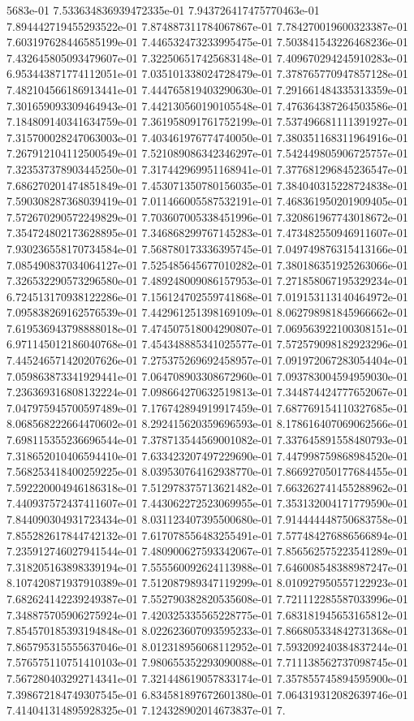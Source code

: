5683e-01	7.533634836939472335e-01	7.943726417475770463e-01	7.894442719455293522e-01	7.874887311784067867e-01	7.784270019600323387e-01	7.603197628446585199e-01	7.446532473233995475e-01	7.503841543226468236e-01	7.432645805093479607e-01	7.322506517425683148e-01	7.409670294245910283e-01	6.953443871774112051e-01	7.035101338024728479e-01	7.378765770947857128e-01	7.482104566186913441e-01	7.444765819403290630e-01	7.291661484335313359e-01	7.301659093309464943e-01	7.442130560190105548e-01	7.476364387264503586e-01	7.184809140341634759e-01	7.361958091761752199e-01	7.537496681111391927e-01	7.315700028247063003e-01	7.403461976774740050e-01	7.380351168311964916e-01	7.267912104112500549e-01	7.521089086342346297e-01	7.542449805906725757e-01	7.323537378903445250e-01	7.317442969951168941e-01	7.377681296845236547e-01	7.686270201474851849e-01	7.453071350780156035e-01	7.384040315228724838e-01	7.590308287368039419e-01	7.011466005587532191e-01	7.468361950201909405e-01	7.572670290572249829e-01	7.703607005338451996e-01	7.320861967743018672e-01	7.354724802173628895e-01	7.346868299767145283e-01	7.473482550946911607e-01	7.930236558170734584e-01	7.568780173336395745e-01	7.049749876315413166e-01	7.085490837034064127e-01	7.525485645677010282e-01	7.380186351925263066e-01	7.326532290573296580e-01	7.489248009086157953e-01	7.271858067195329234e-01	6.724513170938122286e-01	7.156124702559741868e-01	7.019153113140464972e-01	7.095838269162576539e-01	7.442961251398169109e-01	8.062798981845966662e-01	7.619536943798888018e-01	7.474507518004290807e-01	7.069563922100308151e-01	6.971145012186040768e-01	7.454348885341025577e-01	7.572579098182923296e-01	7.445246571420207626e-01	7.275375269692458957e-01	7.091972067283054404e-01	7.059863873341929441e-01	7.064708903308672960e-01	7.093783004594959030e-01	7.236369316808132224e-01	7.098664270632519813e-01	7.344874424777652067e-01	7.047975945700597489e-01	7.176742894919917459e-01	7.687769154110327685e-01	8.068568222664470602e-01	8.292415620359696593e-01	8.178616407069062566e-01	7.698115355236696544e-01	7.378713544569001082e-01	7.337645891558480793e-01	7.318652010406594410e-01	7.633423207497229690e-01	7.447998759868984520e-01	7.568253418400259225e-01	8.039530764162938770e-01	7.866927050177684455e-01	7.592220004946186318e-01	7.512978375713621482e-01	7.663262741455288962e-01	7.440937572437411607e-01	7.443062272523069955e-01	7.353132004171779590e-01	7.844090304931723434e-01	8.031123407395500680e-01	7.914444448750683758e-01	7.855282617844742132e-01	7.617078556483255491e-01	7.577484276886566894e-01	7.235912746027941544e-01	7.480900627593342067e-01	7.856562575223541289e-01	7.318205163898339194e-01	7.555560092624113988e-01	7.646008548388987247e-01	8.107420871937910389e-01	7.512087989347119299e-01	8.010927950557122923e-01	7.682624142239249387e-01	7.552790382820535608e-01	7.721112285587033996e-01	7.348875705906275924e-01	7.420325335565228775e-01	7.683181945653165812e-01	7.854570185393194848e-01	8.022623607093595233e-01	7.866805334842731368e-01	7.865795315555637046e-01	8.012318956068112952e-01	7.593209240384837244e-01	7.576575110751410103e-01	7.980655352293090088e-01	7.711138562737098745e-01	7.567280403292714341e-01	7.321448619057833174e-01	7.357855745894595900e-01	7.398672184749307545e-01	6.834581897672601380e-01	7.064319312082639746e-01	7.414041314895928325e-01	7.124328902014673837e-01	7.